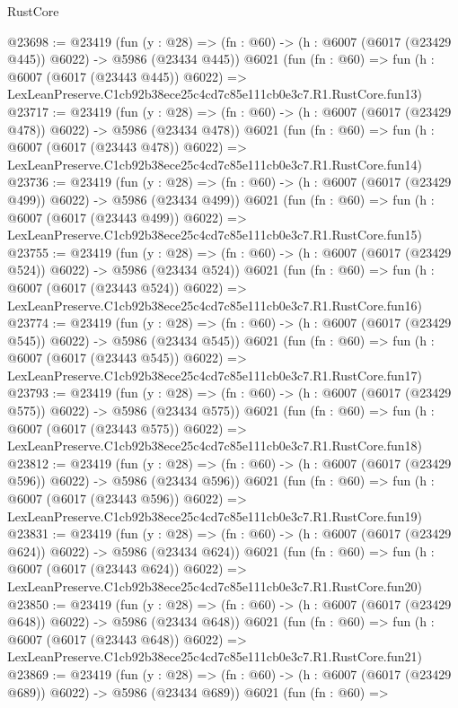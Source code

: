 \begin{lexlean}{RustCore}
\begin{coremodule}
@23698 := @23419
    (fun (y : @28) => (fn : @60) -> (h : @6007 (@6017 (@23429 @445)) @6022) -> @5986 (@23434 @445))
    @6021
    (fun (fn : @60) =>
    fun (h : @6007 (@6017 (@23443 @445)) @6022) =>
    LexLeanPreserve.C1cb92b38ece25c4cd7c85e111cb0e3c7.R1.RustCore.fun13)
@23717 := @23419
    (fun (y : @28) => (fn : @60) -> (h : @6007 (@6017 (@23429 @478)) @6022) -> @5986 (@23434 @478))
    @6021
    (fun (fn : @60) =>
    fun (h : @6007 (@6017 (@23443 @478)) @6022) =>
    LexLeanPreserve.C1cb92b38ece25c4cd7c85e111cb0e3c7.R1.RustCore.fun14)
@23736 := @23419
    (fun (y : @28) => (fn : @60) -> (h : @6007 (@6017 (@23429 @499)) @6022) -> @5986 (@23434 @499))
    @6021
    (fun (fn : @60) =>
    fun (h : @6007 (@6017 (@23443 @499)) @6022) =>
    LexLeanPreserve.C1cb92b38ece25c4cd7c85e111cb0e3c7.R1.RustCore.fun15)
@23755 := @23419
    (fun (y : @28) => (fn : @60) -> (h : @6007 (@6017 (@23429 @524)) @6022) -> @5986 (@23434 @524))
    @6021
    (fun (fn : @60) =>
    fun (h : @6007 (@6017 (@23443 @524)) @6022) =>
    LexLeanPreserve.C1cb92b38ece25c4cd7c85e111cb0e3c7.R1.RustCore.fun16)
@23774 := @23419
    (fun (y : @28) => (fn : @60) -> (h : @6007 (@6017 (@23429 @545)) @6022) -> @5986 (@23434 @545))
    @6021
    (fun (fn : @60) =>
    fun (h : @6007 (@6017 (@23443 @545)) @6022) =>
    LexLeanPreserve.C1cb92b38ece25c4cd7c85e111cb0e3c7.R1.RustCore.fun17)
@23793 := @23419
    (fun (y : @28) => (fn : @60) -> (h : @6007 (@6017 (@23429 @575)) @6022) -> @5986 (@23434 @575))
    @6021
    (fun (fn : @60) =>
    fun (h : @6007 (@6017 (@23443 @575)) @6022) =>
    LexLeanPreserve.C1cb92b38ece25c4cd7c85e111cb0e3c7.R1.RustCore.fun18)
@23812 := @23419
    (fun (y : @28) => (fn : @60) -> (h : @6007 (@6017 (@23429 @596)) @6022) -> @5986 (@23434 @596))
    @6021
    (fun (fn : @60) =>
    fun (h : @6007 (@6017 (@23443 @596)) @6022) =>
    LexLeanPreserve.C1cb92b38ece25c4cd7c85e111cb0e3c7.R1.RustCore.fun19)
@23831 := @23419
    (fun (y : @28) => (fn : @60) -> (h : @6007 (@6017 (@23429 @624)) @6022) -> @5986 (@23434 @624))
    @6021
    (fun (fn : @60) =>
    fun (h : @6007 (@6017 (@23443 @624)) @6022) =>
    LexLeanPreserve.C1cb92b38ece25c4cd7c85e111cb0e3c7.R1.RustCore.fun20)
@23850 := @23419
    (fun (y : @28) => (fn : @60) -> (h : @6007 (@6017 (@23429 @648)) @6022) -> @5986 (@23434 @648))
    @6021
    (fun (fn : @60) =>
    fun (h : @6007 (@6017 (@23443 @648)) @6022) =>
    LexLeanPreserve.C1cb92b38ece25c4cd7c85e111cb0e3c7.R1.RustCore.fun21)
@23869 := @23419
    (fun (y : @28) => (fn : @60) -> (h : @6007 (@6017 (@23429 @689)) @6022) -> @5986 (@23434 @689))
    @6021
    (fun (fn : @60) =>

\end{coremodule}
\end{lexlean}
